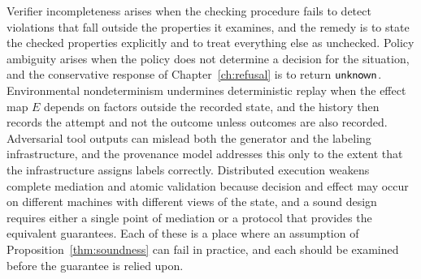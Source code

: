 Verifier incompleteness arises when the checking procedure fails to detect violations that fall outside the properties it examines, and the remedy is to state the checked properties explicitly and to treat everything else as unchecked. Policy ambiguity arises when the policy does not determine a decision for the situation, and the conservative response of Chapter~\ref{ch:refusal} is to return $\mathsf{unknown}$. Environmental nondeterminism undermines deterministic replay when the effect map $E$ depends on factors outside the recorded state, and the history then records the attempt and not the outcome unless outcomes are also recorded. Adversarial tool outputs can mislead both the generator and the labeling infrastructure, and the provenance model addresses this only to the extent that the infrastructure assigns labels correctly. Distributed execution weakens complete mediation and atomic validation because decision and effect may occur on different machines with different views of the state, and a sound design requires either a single point of mediation or a protocol that provides the equivalent guarantees. Each of these is a place where an assumption of Proposition~\ref{thm:soundness} can fail in practice, and each should be examined before the guarantee is relied upon.
